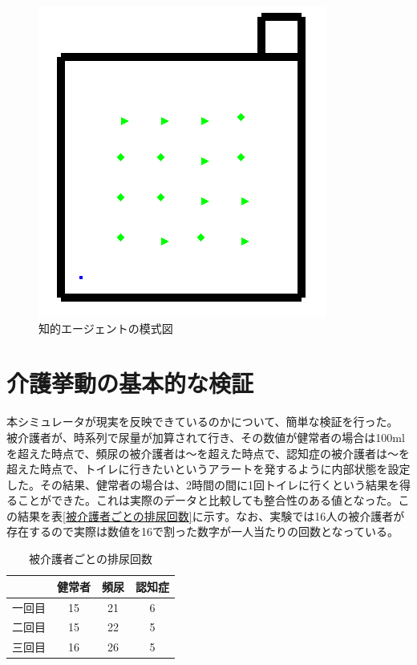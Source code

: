\begin{figure}[htb]
\begin{center}
 \includegraphics[scale=0.6]{figures/dementia_urinate_v1.png}
 \caption[知的エージェントの模式図]{知的エージェントの模式図 \label{dementia_urinate_v1}}
\end{center}
\end{figure}

\section{介護挙動の基本的な検証}

本シミュレータが現実を反映できているのかについて、簡単な検証を行った。
被介護者が、時系列で尿量が加算されて行き、その数値が健常者の場合は100mlを超えた時点で、頻尿の被介護者は〜を超えた時点で、認知症の被介護者は〜を超えた時点で、トイレに行きたいというアラートを発するように内部状態を設定した。その結果、健常者の場合は、2時間の間に1回トイレに行くという結果を得ることができた。これは実際のデータと比較しても整合性のある値となった。この結果を表\ref{被介護者ごとの排尿回数}に示す。なお、実験では16人の被介護者が存在するので実際は数値を16で割った数字が一人当たりの回数となっている。

\begin{table}[htb]
  \caption[被介護者ごとの排尿回数]{被介護者ごとの排尿回数}
  \label{model_explaination}
  \centering
  \begin{tabular}{r|c|c|c}
     & 健常者 & 頻尿 & 認知症 \\ \hline
    一回目 & 15 & 21 & 6 \\
    二回目 & 15 & 22 & 5 \\
    三回目 & 16 & 26 & 5 \\
    \end{tabular}
\end{table}


